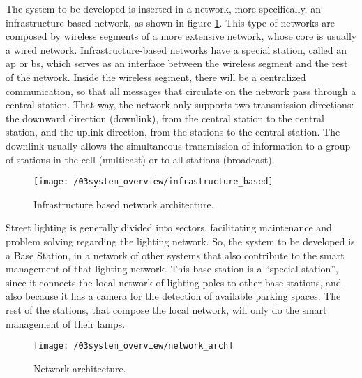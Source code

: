 The system to be developed is inserted in a network, more specifically, an infrastructure based network, as shown in figure \ref{fig:infr_based_arch}. This type of networks are composed by wireless segments of a more extensive network, whose core is usually a wired network. Infrastructure-based networks have a special station, called an \ac{ap} or  \ac{bs}, which serves as an interface between the wireless segment and the rest of the network. Inside the wireless segment, there will be a centralized communication, so that all messages that circulate on the network pass through a central station. That way, the network only supports two transmission directions: the downward direction (downlink), from the central station to the central station, and the uplink direction, from the stations to the central station. The downlink usually allows the simultaneous transmission of information to a group of stations in the cell (multicast) or to all stations (broadcast).

\begin{figure}[ht]
	\centering
	\texttt{[image: /03system\_overview/infrastructure\_based]}
	\caption{Infrastructure based network architecture.}
	\label{fig:infr_based_arch}
\end{figure}

Street lighting is generally divided into sectors, facilitating maintenance and problem solving regarding the lighting network. So, the system to be developed is a Base Station, in a network of other systems that also contribute to the smart management of that lighting network. This base station is a “special station”, since it connects the local network of lighting poles to other base stations, and also because it has a camera for the detection of available parking spaces. The rest of the stations, that compose the local network, will only do the smart management of their lamps.

\begin{figure}[ht]
	\centering
	\texttt{[image: /03system\_overview/network\_arch]}
	\caption{Network architecture.}
	\label{fig:network_arch}
\end{figure}